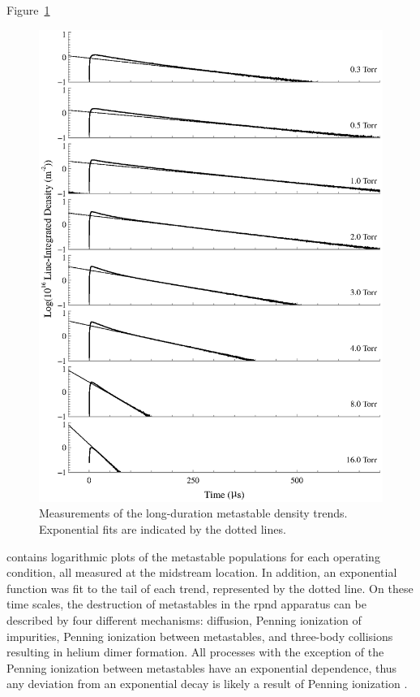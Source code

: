 Figure~\ref{fig:long}
\begin{figure}
  \centering
  \includegraphics{./chapters/metastables/figures/long.eps}
  \caption{Measurements of the long-duration metastable density trends.
  Exponential fits are indicated by the dotted lines.}
  \label{fig:long}
\end{figure}
contains logarithmic plots of the metastable populations for each operating
condition, all measured at the midstream location. In addition, an exponential
function was fit to the tail of each trend, represented by the dotted line. On
these time scales, the destruction of metastables in the \acs{rpnd} apparatus
can be described by four different mechanisms: diffusion, Penning ionization of
impurities, Penning ionization between metastables, and three-body collisions
resulting in helium dimer formation. All processes with the exception of the
Penning ionization between metastables have an exponential dependence, thus any
deviation from an exponential decay is likely a result of Penning ionization
\cite{Deloche1976}.

